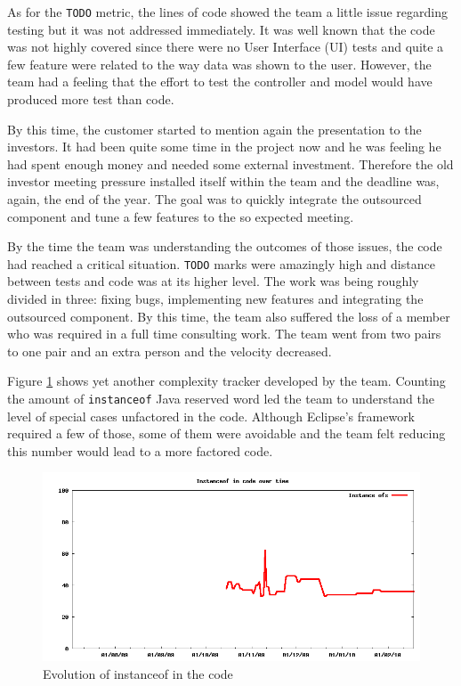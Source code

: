 \documentclass[lnbip]{svmultln}
\begin{document}
As for the \texttt{TODO} metric, the lines of code showed the team a
little issue regarding testing but it was not addressed immediately. It
was well known that the code was not highly covered since there were
no User Interface (UI) tests and quite a few feature were related to
the way data was shown to the user. However, the team had a feeling
that the effort to test the controller and model would have produced
more test than code.

By this time, the customer started to mention again the presentation
to the investors. It had been quite some time in the project now and
he was feeling he had spent enough money and needed some external
investment. Therefore the old investor meeting pressure installed
itself within the team and the deadline was, again, the end of the
year. The goal was to quickly integrate the outsourced component and
tune a few features to the so expected meeting.

By the time the team was understanding the outcomes of those issues,
the code had reached a critical situation. \texttt{TODO} marks were
amazingly high and distance between tests and code was at its higher
level. The work was being roughly divided in three: fixing bugs,
implementing new features and integrating the outsourced component. By
this time, the team also suffered the loss of a member who was
required in a full time consulting work. The team went from two pairs
to one pair and an extra person and the velocity decreased.

Figure \ref{fig:InstanceOfs} shows yet another complexity tracker
developed by the team. Counting the amount of \texttt{instanceof} Java
reserved word led the team to understand the level of special cases
unfactored in the code. Although Eclipse's framework required a few of
those, some of them were avoidable and the team felt reducing this
number would lead to a more factored code.

\begin{figure}[hbt]
  \centerline{
    \includegraphics[width=120mm]{InstanceOfs.png}
  }
  \caption{Evolution of instanceof in the code }
  \label{fig:InstanceOfs}
\end{figure}
\end{document}
